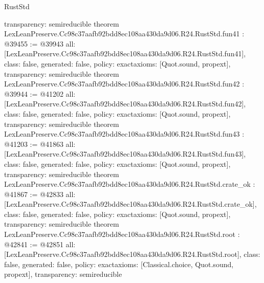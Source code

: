 \begin{lexlean}{RustStd}
\begin{coremodule}
{  transparency: semireducible
}
theorem LexLeanPreserve.Cc98c37aafb92bdd8ec108aa430da9d06.R24.RustStd.fun41 : @39455 := @39943 {
  all: [LexLeanPreserve.Cc98c37aafb92bdd8ec108aa430da9d06.R24.RustStd.fun41],
  class: false,
  generated: false,
  policy: exact{axioms: [Quot.sound, propext]},
  transparency: semireducible
}
theorem LexLeanPreserve.Cc98c37aafb92bdd8ec108aa430da9d06.R24.RustStd.fun42 : @39944 := @41202 {
  all: [LexLeanPreserve.Cc98c37aafb92bdd8ec108aa430da9d06.R24.RustStd.fun42],
  class: false,
  generated: false,
  policy: exact{axioms: [Quot.sound, propext]},
  transparency: semireducible
}
theorem LexLeanPreserve.Cc98c37aafb92bdd8ec108aa430da9d06.R24.RustStd.fun43 : @41203 := @41863 {
  all: [LexLeanPreserve.Cc98c37aafb92bdd8ec108aa430da9d06.R24.RustStd.fun43],
  class: false,
  generated: false,
  policy: exact{axioms: [Quot.sound, propext]},
  transparency: semireducible
}
theorem LexLeanPreserve.Cc98c37aafb92bdd8ec108aa430da9d06.R24.RustStd.crate_ok : @41867 := @42833 {
  all: [LexLeanPreserve.Cc98c37aafb92bdd8ec108aa430da9d06.R24.RustStd.crate_ok],
  class: false,
  generated: false,
  policy: exact{axioms: [Quot.sound, propext]},
  transparency: semireducible
}
theorem LexLeanPreserve.Cc98c37aafb92bdd8ec108aa430da9d06.R24.RustStd.root : @42841 := @42851 {
  all: [LexLeanPreserve.Cc98c37aafb92bdd8ec108aa430da9d06.R24.RustStd.root],
  class: false,
  generated: false,
  policy: exact{axioms: [Classical.choice, Quot.sound, propext]},
  transparency: semireducible
}


\end{coremodule}
\end{lexlean}
